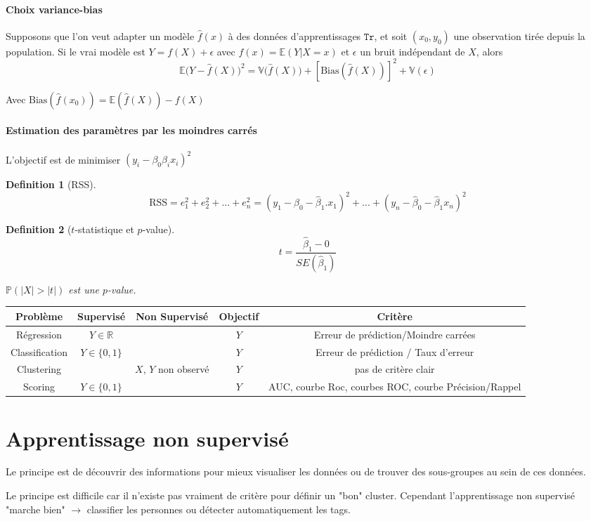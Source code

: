 \documentclass{article}
\newtheorem{defi}{Definition}
\begin{document}
\paragraph{Choix variance-bias} Supposons que l'on veut adapter un modèle $\hat{f}(x)$ à des données d'apprentissages $\mathtt{Tr}$, et soit $(x_0, y_0)$ une observation tirée depuis la population. Si le vrai modèle est $Y= f(X) + \epsilon$ avec $f(x)=\mathbb{E}(Y|X=x)$ et $\epsilon$ un bruit indépendant de $X$, alors
\[\mathbb{E}\Big(Y - \hat{f}(X)\Big)^2 = \mathbb{V}\big(\hat{f}(X)\big) + [\text{Bias}(\hat{f}(X))]^2 + \mathbb{V}(\epsilon)\]

Avec $\text{Bias}(\hat{f}(x_0))=\mathbb{E}(\hat{f}(X))-f(X)$

\paragraph{Estimation des paramètres par les moindres carrés}
L'objectif est de minimiser $(y_i - \beta_0 \beta_i x_i)^2$

\begin{defi}[RSS]
\[\text{RSS} = e_1^2 + e_2^2 + ... + e_n^2 = (y_1 - \hat{\beta}_0 - \hat{\beta}_1.x_1)^2 + ... + (y_n - \hat{\beta}_0 - \hat{\beta}_1 x_n)^2\]
\end{defi}

\begin{defi}[$t$-statistique et $p$-value]
\[t=\dfrac{\hat{\beta}_1 - 0}{SE(\hat{\beta}_1)}\]

$\mathbb{P}(|X|>|t|)$ est une $p$-value.
\end{defi}



\begin{adjustbox}{max width=\textwidth}
\begin{tabular}{c|c|c|c|c}
Problème & Supervisé & Non Supervisé & Objectif & Critère\\
\hline
Régression & $Y\in \mathbb{R}$ & & $Y$ & Erreur de prédiction/Moindre carrées\\
Classification & $Y\in \{0,1\}$ & & $Y$ & Erreur de prédiction / Taux d'erreur\\
Clustering & & $X$, $Y$ non observé & $Y$ & pas de critère clair\\
Scoring & $Y\in\{ 0, 1\}$ & & $Y$ & AUC, courbe Roc, courbes ROC, courbe Précision/Rappel\\
\hline
\end{tabular}
\end{adjustbox}


\section{Apprentissage non supervisé}
Le principe est de découvrir des informations pour mieux visualiser les données ou de trouver des sous-groupes au sein de ces données.

Le principe est difficile car il n'existe pas vraiment de critère pour définir un "bon" cluster. Cependant l'apprentissage non supervisé "marche bien" $\to$ classifier les personnes ou détecter automatiquement les tags.
\end{document}
